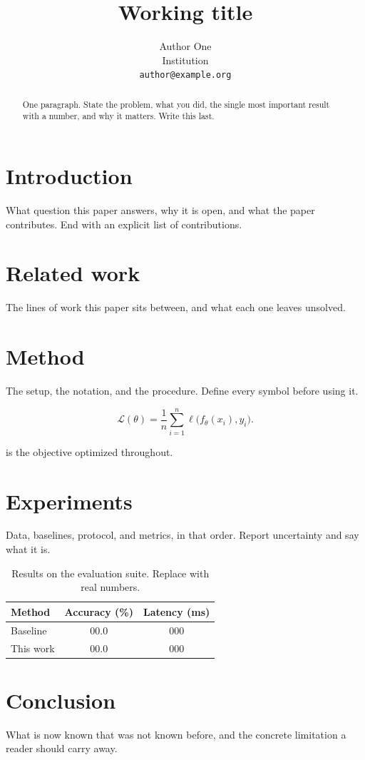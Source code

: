 \documentclass[11pt]{article}
\title{Working title}
\author{Author One\\ Institution\\ \texttt{author@example.org}}
\date{}
\begin{document}
\maketitle

\begin{abstract}
One paragraph. State the problem, what you did, the single most important
result with a number, and why it matters. Write this last.
\end{abstract}

\section{Introduction}
\label{sec:introduction}

What question this paper answers, why it is open, and what the paper
contributes. End with an explicit list of contributions.

\section{Related work}
\label{sec:related}

The lines of work this paper sits between, and what each one leaves unsolved.

\section{Method}
\label{sec:method}

The setup, the notation, and the procedure. Define every symbol before using it.

\begin{equation}
\label{eq:objective}
\mathcal{L}(\theta) = \frac{1}{n} \sum_{i=1}^{n} \ell\bigl(f_\theta(x_i), y_i\bigr).
\end{equation}

 is the objective optimized throughout.

\section{Experiments}
\label{sec:experiments}

Data, baselines, protocol, and metrics, in that order. Report uncertainty and
say what it is.

\begin{table}[t]
  \centering
  \caption{Results on the evaluation suite. Replace with real numbers.}
  \label{tab:results}
  \begin{tabular}{lcc}
    \toprule
    Method & Accuracy (\%) & Latency (ms) \\
    \midrule
    Baseline & 00.0 & 000 \\
    This work & 00.0 & 000 \\
    \bottomrule
  \end{tabular}
\end{table}

\section{Conclusion}
\label{sec:conclusion}

What is now known that was not known before, and the concrete limitation a
reader should carry away.



\end{document}
